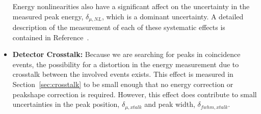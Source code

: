 \documentclass[notitlepage,rmp,aps,10pt]{revtex4-1}
\begin{document}
\begin{itemize}
  Energy nonlinearities also have a significant affect on the uncertainty in the measured peak energy, $\delta_{\mu,NL}$, which is a dominant uncertainty.
  A detailed description of the measurement of each of these systematic effects is contained in Reference~\cite{energysystunidoc}.
\item \textbf{Detector Crosstalk:} Because we are searching for peaks in coincidence events, the possibility for a distortion in the energy measurement due to crosstalk between the involved events exists.
  This effect is measured in Section~\ref{sec:crosstalk} to be small enough that no energy correction or peakshape correction is required.
  However, this effect does contribute to small uncertainties in the peak position, $\delta_{\mu,xtalk}$ and peak width, $\delta_{fwhm,xtalk}$.
\end{itemize}
\end{document}
